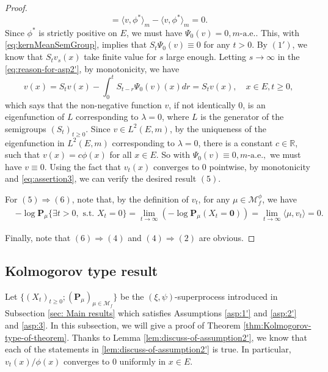 \documentclass[UTF8]{pkuthss}
\theoremstyle{plain}
\theoremstyle{definition}
\numberwithin{equation}{section}
\begin{document}
\begin{proof}
\[	= \langle v, \phi^* \rangle_m - \langle v, \phi^* \rangle_m
	= 0.
\]
	Since $\phi^*$ is strictly positive on $E$, we must have $\Psi_0(v) = 0, m\text{-a.e.}$.
	This, with \eqref{eq:kernMeanSemGroup}, implies that $S_t\Psi_0 (v)\equiv 0$ for any $t>0$.
	By $(1')$, we know that $S_t v_s(x)$ take finite value for $s$ large enough.
	Letting $s\to\infty$ in the \eqref{eq:reason-for-asp2'}, by monotonicity, we have
\[
	v(x)
	=S_tv(x)-\int_0^t S_{t-r}\Psi_0(v)(x)dr=S_tv(x),
	\quad x\in E, t\geq 0,
\]
which says that the non-negative function $v$, if not identically 0,  is an eigenfunction  of $L$  corresponding to $\lambda=0$, where $L$ is the generator of the semigroups $(S_t)_{t \geq 0}$.
	Since $v\in L^2(E,m)$, by the uniqueness of the eigenfunction   in  $L^2(E,m)$ corresponding to $\lambda=0$,
there is a constant $c\in \mathbb R$, such that $v(x) = c\phi(x)$ for all $x\in E$.
	So with $\Psi_0 (v) \equiv 0, m\text{-a.e.},$ we must have $v\equiv 0$.
	Using the fact that $v_t(x)$ converges to $0$ pointwise, by monotonicity and \eqref{eq:assertion3}, we can verify the desired result $(5)$.
\par
	For $(5)\Rightarrow (6)$, note that,
by the definition of $v_t$,
	for any $\mu\in\mathcal M_f^\phi$, we have
\[\begin{split}
	&-\log\mathbf P_\mu\{\exists t>0,\text{ s.t. }X_t=0\}
	=\lim_{t\to \infty}(-\log\mathbf P_\mu(X_t = \mathbf 0))
	=\lim_{t\to\infty}\langle\mu, v_t\rangle
	= 0.
\end{split}\]
\par
	Finally, note that $(6)\Rightarrow (4)$ and $(4)\Rightarrow (2)$ are obvious.
\end{proof}

\subsection{Kolmogorov type result}
	Let $\{(X_t)_{t\geq 0}; (\mathbf P_\mu)_{\mu \in \mathcal M_f}\}$ be the $(\xi,\psi)$-superprocess introduced in Subsection \ref{sec: Main results} which satisfies Assumptions \ref{asp:1'} and \ref{asp:2'} and \ref{asp:3}.
	In this subsection, we will give a proof of Theorem \ref{thm:Kolmogorov-type-of-theorem}. Thanks to Lemma \ref{lem:discuss-of-assumption2'}, we know that each of the statements in \ref{lem:discuss-of-assumption2'} is true.
	In particular, $v_t(x)/\phi(x)$ converges to $0$ uniformly in $x\in E$.
\end{document}
